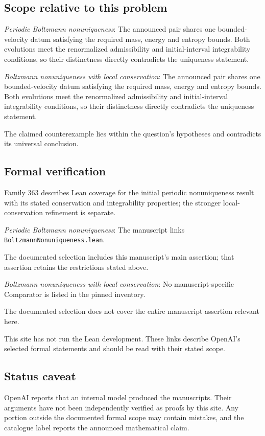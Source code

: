 \documentclass[11pt]{article}
\begin{document}
\subsection{Scope relative to this problem}
\textit{Periodic Boltzmann nonuniqueness}: The announced pair shares one bounded-velocity datum satisfying the required mass, energy and entropy bounds. Both evolutions meet the renormalized admissibility and initial-interval integrability conditions, so their distinctness directly contradicts the uniqueness statement.

\textit{Boltzmann nonuniqueness with local conservation}: The announced pair shares one bounded-velocity datum satisfying the required mass, energy and entropy bounds. Both evolutions meet the renormalized admissibility and initial-interval integrability conditions, so their distinctness directly contradicts the uniqueness statement.

The claimed counterexample lies within the question’s hypotheses and contradicts its universal conclusion.

\subsection{Formal verification}
Family 363 describes Lean coverage for the initial periodic nonuniqueness result with its stated conservation and integrability properties; the stronger local-conservation refinement is separate.

\textit{Periodic Boltzmann nonuniqueness}: The manuscript links \texttt{BoltzmannNonuniqueness.lean}.

The documented selection includes this manuscript’s main assertion; that assertion retains the restrictions stated above.

\textit{Boltzmann nonuniqueness with local conservation}: No manuscript-specific Comparator is listed in the pinned inventory.

The documented selection does not cover the entire manuscript assertion relevant here.

This site has not run the Lean development. These links describe OpenAI’s selected formal statements and should be read with their stated scope.

\subsection{Status caveat}
OpenAI reports that an internal model produced the manuscripts. Their arguments have not been independently verified as proofs by this site. Any portion outside the documented formal scope may contain mistakes, and the catalogue label reports the announced mathematical claim.
\end{document}
